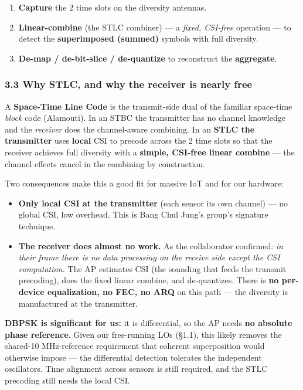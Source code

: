 \documentclass[
  10pt,
]{article}
\providecommand{\tightlist}{%
  \setlength{\itemsep}{0pt}\setlength{\parskip}{0pt}}
\begin{document}
\begin{enumerate}
\def\labelenumi{\arabic{enumi}.}
\setcounter{enumi}{4}
\tightlist
\item
  \textbf{Capture} the 2 time slots on the diversity antennas.
\item
  \textbf{Linear-combine} (the STLC combiner) --- a \emph{fixed,
  CSI-free} operation --- to detect the \textbf{superimposed (summed)}
  symbols with full diversity.
\item
  \textbf{De-map / de-bit-slice / de-quantize} to reconstruct the
  \textbf{aggregate}.
\end{enumerate}

\hypertarget{33-why-stlc-and-why-the-receiver-is-nearly-free}{%
\subsubsection{3.3 Why STLC, and why the receiver is nearly
free}\label{33-why-stlc-and-why-the-receiver-is-nearly-free}}

A \textbf{Space-Time Line Code} is the transmit-side dual of the
familiar space-time \emph{block} code (Alamouti). In an STBC the
transmitter has no channel knowledge and the \emph{receiver} does the
channel-aware combining. In an \textbf{STLC the transmitter} uses
\textbf{local} CSI to precode across the 2 time slots so that the
receiver achieves full diversity with a \textbf{simple, CSI-free linear
combine} --- the channel effects cancel in the combining by
construction.

Two consequences make this a good fit for massive IoT and for our
hardware:

\begin{itemize}
\tightlist
\item
  \textbf{Only local CSI at the transmitter} (each sensor its own
  channel) --- no global CSI, low overhead. This is Bang Chul Jung's
  group's signature technique.
\item
  \textbf{The receiver does almost no work.} As the collaborator
  confirmed: \emph{in their frame there is no data processing on the
  receive side except the CSI computation.} The AP estimates CSI (the
  sounding that feeds the transmit precoding), does the fixed linear
  combine, and de-quantizes. There is \textbf{no per-device
  equalization, no FEC, no ARQ} on this path --- the diversity is
  manufactured at the transmitter.
\end{itemize}

\textbf{DBPSK is significant for us:} it is differential, so the AP
needs \textbf{no absolute phase reference}. Given our free-running LOs
(§1.1), this likely removes the shared-10 MHz-reference requirement that
coherent superposition would otherwise impose --- the differential
detection tolerates the independent oscillators. Time alignment across
sensors is still required, and the STLC precoding still needs the local
CSI.
\end{document}
